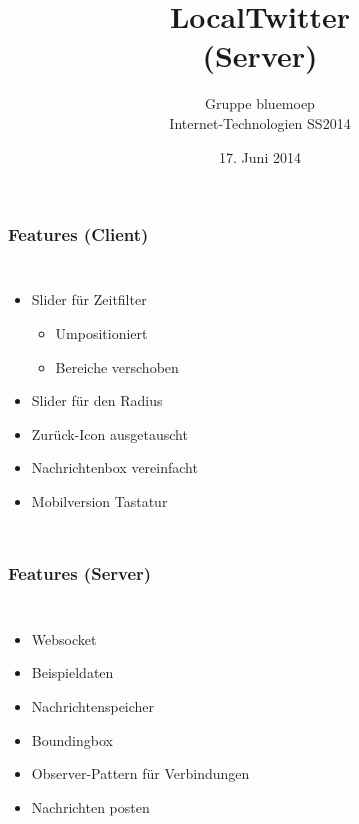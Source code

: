 \documentclass[aspectratio=43]{beamer}
\title{LocalTwitter\\(Server)}
\author{Gruppe bluemoep\\Internet-Technologien SS2014}
\date{17. Juni 2014}
\begin{document}
\frame{\maketitle}
 
\begin{frame}
	\frametitle{Features (Client)}
	\begin{columns}
		\column[t]{\textwidth}
			\begin{itemize}
			\item Slider für Zeitfilter
			\begin{itemize}
				\item Umpositioniert
				\item Bereiche verschoben
			\end{itemize}
			\item Slider für den Radius
			\item Zurück-Icon ausgetauscht
			\item Nachrichtenbox vereinfacht
			\item Mobilversion Tastatur
			\end{itemize}
	\end{columns}
\end{frame}

\begin{frame}
	\frametitle{Features (Server)}
	\begin{columns}
		\column[t]{\textwidth}
			\begin{itemize}
			\item Websocket
			\item Beispieldaten
			\item Nachrichtenspeicher
			\item Boundingbox
			\item Observer-Pattern für Verbindungen
			\item Nachrichten posten
			\end{itemize}
	\end{columns}
\end{frame}

\end{document}
